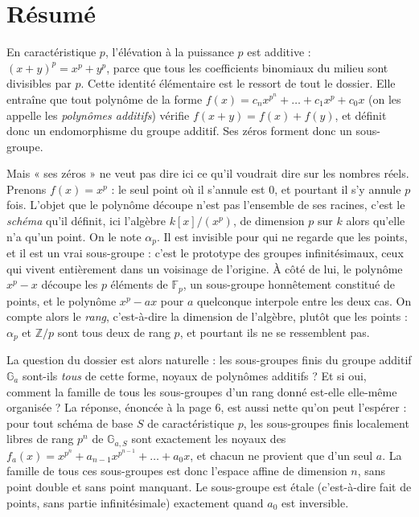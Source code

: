 \documentclass[11pt,a4paper]{article}
\begin{document}
\section*{Résumé}

\begin{resume}
En caractéristique $p$, l'élévation à la puissance $p$ est additive :
$(x+y)^p = x^p + y^p$, parce que tous les coefficients binomiaux du milieu
sont divisibles par $p$. Cette identité élémentaire est le ressort
de tout le dossier. Elle entraîne que tout polynôme de la forme
$f(x) = c_n x^{p^n} + \dots + c_1 x^p + c_0 x$ (on les appelle les
\emph{polynômes additifs}) vérifie $f(x+y) = f(x) + f(y)$, et définit donc un
endomorphisme du groupe
additif. Ses zéros forment donc un sous-groupe.

Mais « ses zéros » ne veut pas dire ici ce qu'il voudrait dire sur les
nombres réels. Prenons $f(x) = x^p$ : le seul point où il s'annule est $0$,
et pourtant il s'y annule $p$ fois. L'objet que le polynôme découpe n'est pas
l'ensemble de ses racines, c'est le \emph{schéma} qu'il définit, ici
l'algèbre $k[x]/(x^p)$, de dimension $p$ sur $k$ alors qu'elle n'a qu'un
point. On le note $\alpha_p$. Il est invisible pour qui ne regarde que les
points, et il est un vrai sous-groupe : c'est le prototype des groupes
infinitésimaux, ceux qui vivent entièrement dans un voisinage de l'origine.
À côté de lui, le polynôme $x^p - x$ découpe les $p$ éléments de
$\mathbb{F}_p$, un sous-groupe honnêtement constitué de points, et le
polynôme $x^p - a x$ pour $a$ quelconque interpole entre les deux cas. On
compte alors le \emph{rang}, c'est-à-dire la
dimension de l'algèbre, plutôt que les points : $\alpha_p$ et $\mathbb{Z}/p$ sont tous deux de
rang $p$, et pourtant ils ne se ressemblent pas.

La question du dossier est alors naturelle : les sous-groupes finis du groupe
additif $\mathbb{G}_a$ sont-ils \emph{tous} de cette forme, noyaux de
polynômes additifs ? Et si oui, comment la famille de tous les sous-groupes
d'un rang donné est-elle elle-même organisée ? La réponse, énoncée à la
page 6, est aussi nette qu'on peut l'espérer : pour tout schéma de base
$S$ de caractéristique $p$, les sous-groupes finis localement libres de rang
$p^n$ de $\mathbb{G}_{a,S}$ sont exactement les noyaux des
$f_a(x) = x^{p^n} + a_{n-1}x^{p^{n-1}} + \dots + a_0 x$, et chacun ne
provient que d'un seul $a$. La famille de tous ces sous-groupes est donc
l'espace affine de dimension $n$, sans point double et sans point manquant.
Le sous-groupe est étale (c'est-à-dire fait de points, sans partie
infinitésimale) exactement quand $a_0$ est inversible.


\end{resume}
\end{document}
